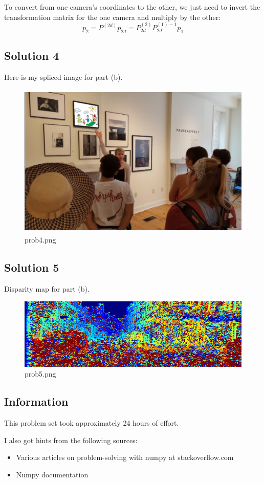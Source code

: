 \documentclass{article}
\newcommand{\info}{\clearpage \subsection*{Information}}
\newcommand{\solution}[1]{\clearpage \subsection*{Solution #1}}
\begin{document}
To convert from one camera's coordinates to the other, we just need to invert the transformation matrix for the one camera and multiply by the other:
\begin{equation}
p_2 = P^{(2d)}p_{2d} = P^{(2)}_{2d}P^{(1)-1}_{2d}p_1
\end{equation}

\solution{4}

Here is my spliced image for part (b).

\begin{figure}[!h]
  \centering
  \includegraphics[height=20em]{code/outputs/prob4.png}
  \caption{prob4.png}
\end{figure}

\solution{5}

Disparity map for part (b).

\begin{figure}[!h]
  \centering
  \includegraphics[width=\textwidth]{code/outputs/prob5.png}
  \caption{prob5.png}
\end{figure}

\info

This problem set took approximately 24 hours of effort.

I also got hints from the following sources:
\begin{itemize}
\item Various articles on problem-solving with numpy at stackoverflow.com
\item Numpy documentation
\end{itemize}
\end{document}
